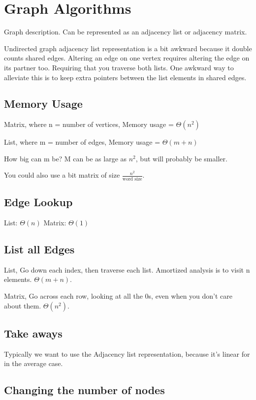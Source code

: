 \documentclass[english, 10pt]{article}
\begin{document}
\section{Graph Algorithms}

Graph description. Can be represented as an adjacency list or adjacency matrix.

Undirected graph adjacency list representation is a bit awkward because it double counts
shared edges. Altering an edge on one vertex requires altering the edge on its
partner too. Requiring that you traverse both lists. One awkward way to
alleviate this is to keep extra pointers between the list elements in shared
edges.

\subsection{Memory Usage}

Matrix, where n = number of vertices, Memory usage = $\Theta(n^2)$

List, where m = number of edges, Memory usage = $\Theta(m+n)$

How big can m be? M can be as large as $n^2$, but will probably be smaller.

You could also use a bit matrix of size $\frac{n^2}{\text{word size}}$.

\subsection{Edge Lookup}
List: $\Theta(n)$
Matrix: $\Theta(1)$

\subsection{List all Edges}

List, Go down each index, then traverse each list. Amortized analysis is to
visit n elements. $\Theta(m+n)$.

Matrix, Go across each row, looking at all the 0s, even when you don't care
about them. $\Theta(n^2)$.

\subsection{Take aways}

Typically we want to use the Adjacency list representation, because it's linear
for in the average case.

\subsection{Changing the number of nodes }
\end{document}
